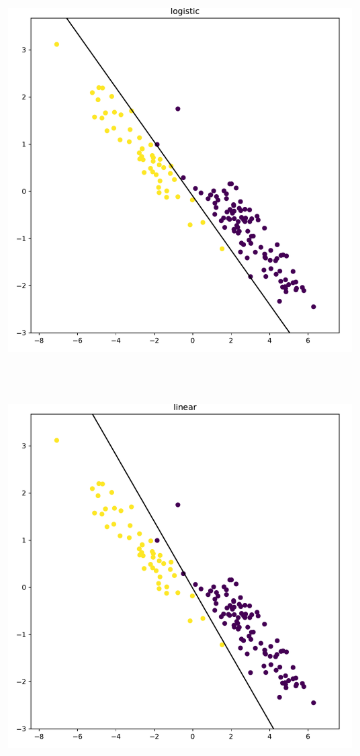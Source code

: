 \documentclass[9pt, oneside]{amsart}   	%
\begin{document}
\begin{figure}[t!]
\begin{subfigure}{.45\textwidth}
  \includegraphics[width=\linewidth]{classificationA_logistic.pdf}
\end{subfigure}
\\[+5pt]
\begin{subfigure}{.45\textwidth}
  \centering
  \includegraphics[width=\linewidth]{classificationA_linear.pdf}

\end{subfigure}
\end{figure}
\end{document}
